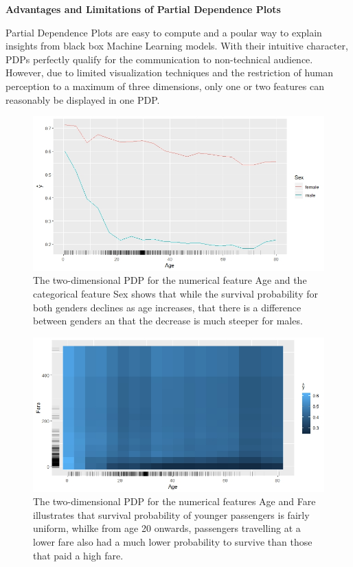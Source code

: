 \documentclass[
]{krantz}
\begin{document}
\textbf{Advantages and Limitations of Partial Dependence Plots}

Partial Dependence Plots are easy to compute and a poular way to explain insights from black box Machine Learning models. With their intuitive character, PDPs perfectly qualify for the communication to non-technical audience. However, due to limited visualization techniques and the restriction of human perception to a maximum of three dimensions, only one or two features can reasonably be displayed in one PDP.\citep{molnar2019}

\begin{figure}
\includegraphics[width=1\linewidth]{images/pdp_2_features_1} \caption{The two-dimensional PDP for the numerical feature Age and the categorical feature Sex shows that while the survival probability for both genders declines as age increases, that there is a difference between genders an that the decrease is much steeper for males.}\label{fig:unnamed-chunk-3}
\end{figure}

\begin{figure}
\includegraphics[width=1\linewidth]{images/pdp_2_features_2} \caption{The two-dimensional PDP for the numerical features Age and Fare illustrates that survival probability of younger passengers is fairly uniform, whilke from age 20 onwards, passengers travelling at a lower fare also had a much lower probability to survive than those that paid a high fare.}\label{fig:unnamed-chunk-4}
\end{figure}
\end{document}
